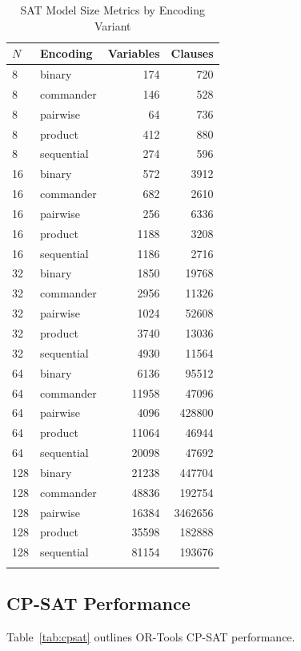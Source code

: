 \documentclass[a4paper,fleqn]{cas-sc}
\begin{document}
\begin{table}[htbp]
\centering
\caption{SAT Model Size Metrics by Encoding Variant} \label{tab:satsize}
\begin{tabular}{llrr}
\toprule
$N$ & Encoding & Variables & Clauses \\
\midrule
8 & binary & 174 & 720 \\
8 & commander & 146 & 528 \\
8 & pairwise & 64 & 736 \\
8 & product & 412 & 880 \\
8 & sequential & 274 & 596 \\
16 & binary & 572 & 3912 \\
16 & commander & 682 & 2610 \\
16 & pairwise & 256 & 6336 \\
16 & product & 1188 & 3208 \\
16 & sequential & 1186 & 2716 \\
32 & binary & 1850 & 19768 \\
32 & commander & 2956 & 11326 \\
32 & pairwise & 1024 & 52608 \\
32 & product & 3740 & 13036 \\
32 & sequential & 4930 & 11564 \\
64 & binary & 6136 & 95512 \\
64 & commander & 11958 & 47096 \\
64 & pairwise & 4096 & 428800 \\
64 & product & 11064 & 46944 \\
64 & sequential & 20098 & 47692 \\
128 & binary & 21238 & 447704 \\
128 & commander & 48836 & 192754 \\
128 & pairwise & 16384 & 3462656 \\
128 & product & 35598 & 182888 \\
128 & sequential & 81154 & 193676 \\
\bottomrule
\tabularnewline
\end{tabular}
\end{table}

\subsection{CP-SAT Performance}
Table~\ref{tab:cpsat} outlines OR-Tools CP-SAT performance.
\end{document}
